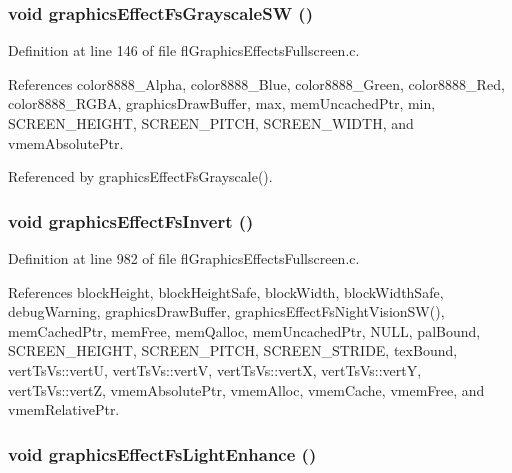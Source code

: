 \subsubsection{\setlength{\rightskip}{0pt plus 5cm}void graphics\-Effect\-Fs\-Grayscale\-SW ()}\label{flGraphicsEffectsFullscreen_8c_d55dd118ed912361ac5992552e9386e9}




Definition at line 146 of file fl\-Graphics\-Effects\-Fullscreen.c.

References color8888\_\-Alpha, color8888\_\-Blue, color8888\_\-Green, color8888\_\-Red, color8888\_\-RGBA, graphics\-Draw\-Buffer, max, mem\-Uncached\-Ptr, min, SCREEN\_\-HEIGHT, SCREEN\_\-PITCH, SCREEN\_\-WIDTH, and vmem\-Absolute\-Ptr.

Referenced by graphics\-Effect\-Fs\-Grayscale().
\subsubsection{\setlength{\rightskip}{0pt plus 5cm}void graphics\-Effect\-Fs\-Invert ()}\label{flGraphicsEffectsFullscreen_8c_09a118987c4bc745af0adc15b73bdf51}




Definition at line 982 of file fl\-Graphics\-Effects\-Fullscreen.c.

References block\-Height, block\-Height\-Safe, block\-Width, block\-Width\-Safe, debug\-Warning, graphics\-Draw\-Buffer, graphics\-Effect\-Fs\-Night\-Vision\-SW(), mem\-Cached\-Ptr, mem\-Free, mem\-Qalloc, mem\-Uncached\-Ptr, NULL, pal\-Bound, SCREEN\_\-HEIGHT, SCREEN\_\-PITCH, SCREEN\_\-STRIDE, tex\-Bound, vert\-Ts\-Vs::vert\-U, vert\-Ts\-Vs::vert\-V, vert\-Ts\-Vs::vert\-X, vert\-Ts\-Vs::vert\-Y, vert\-Ts\-Vs::vert\-Z, vmem\-Absolute\-Ptr, vmem\-Alloc, vmem\-Cache, vmem\-Free, and vmem\-Relative\-Ptr.
\subsubsection{\setlength{\rightskip}{0pt plus 5cm}void graphics\-Effect\-Fs\-Light\-Enhance ()}\label{flGraphicsEffectsFullscreen_8c_628dc4ec92338d4544b60a4a90e37fd5}




